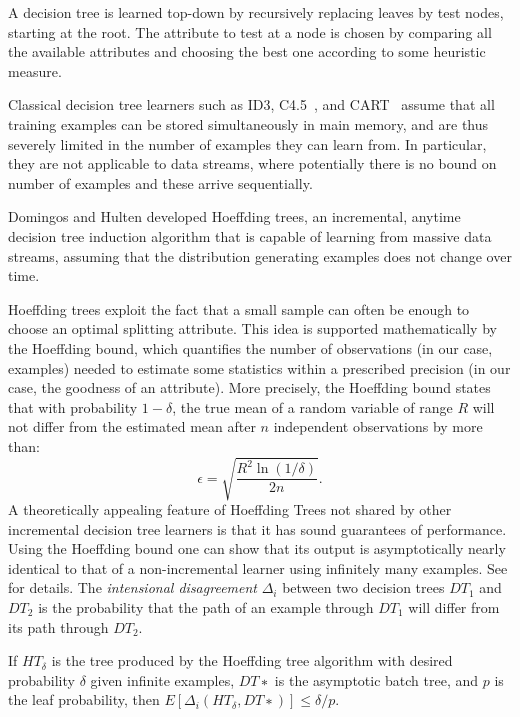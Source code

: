A decision tree is learned top-down by recursively replacing leaves by test nodes, starting at the
root. The attribute to test at a node is chosen by comparing all the available attributes and
choosing the best one according to some heuristic measure.


Classical decision tree learners such as ID3, %
 C4.5~\cite{Quinlan}, and CART~\cite{cart94} 
assume that all training examples can be stored simultaneously in main memory, and are thus severely 
limited in the number of examples they can learn from.
In particular, they are not applicable to data streams, where potentially there is no 
bound on number of examples and these arrive sequentially. 

Domingos and Hulten \cite{vfdt} developed Hoeffding trees,
an incremental, anytime decision tree induction
algorithm that is capable of learning from massive data streams, assuming that 
the distribution generating examples does not change over time.

Hoeffding trees exploit the fact that a small sample can often be enough to choose 
an optimal splitting attribute. This idea is supported mathematically by the Hoeffding bound,
which quantifies the number of observations (in our case, examples) needed to estimate
some statistics within a prescribed precision (in our case, the goodness of an attribute). 
More precisely, the Hoeffding bound states that with probability $1 - \delta$, the true mean of
a random variable of range $R$ will not differ from the estimated mean after $n$
independent observations by more than:
$$ 
\epsilon = \sqrt{\frac{R^2 \ln(1/\delta)}{2n}}.
$$
A theoretically appealing feature of Hoeffding Trees not shared by other 
incremental decision tree learners
is that it has sound guarantees of performance. 
Using the Hoeffding bound
one can show that its output is asymptotically nearly identical 
to that of a non-incremental learner using infinitely many examples.
See \cite{vfdt} for details. 
\ENDOMIT
\BEGINOMIT
The {\em intensional disagreement} $\Delta_i$ between
two decision trees $DT_1$ and $DT_2$ is the probability that the
path of an example through $DT_1$ will differ from its path
through $DT_2$.%

\begin{theorem} 
If $HT_\delta$ is the tree produced by the Hoeffding
tree algorithm with desired probability $\delta$ given infinite examples,
 $DT∗$ is the asymptotic batch tree, and $p$ is
the leaf probability, then $E[\Delta_i (HT_\delta , DT∗ )] \leq \delta/p$.
\end{theorem}

